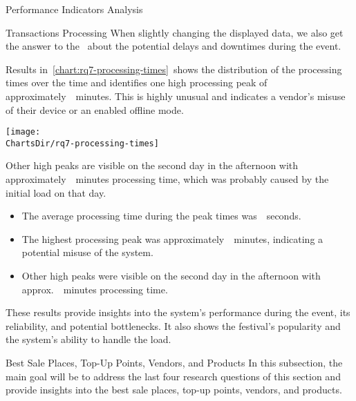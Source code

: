 \begin{section}{Performance Indicators Analysis}
\begin{subsection}{Transactions Processing}
		When slightly changing the displayed data, we also get the answer to the~ about the potential delays and downtimes during the event.


		Results in~\autoref{chart:rq7-processing-times}~shows the distribution of the processing times over the time and identifies one high processing peak of approximately~~minutes.
		This is highly unusual and indicates a vendor's misuse of their device or an enabled offline mode.

		\begin{chart}[h]
			\centering
			\texttt{[image: \\ChartsDir/rq7-processing-times]}
			\caption{ Transaction Processing Times}
			\label{chart:rq7-processing-times}
			\source
		\end{chart}

		Other high peaks are visible on the second day in the afternoon with approximately~~minutes processing time, which was probably caused by the initial load on that day.

		\begin{keytakeaways}
			\begin{itemize}
				\item The average processing time during the peak times was~~seconds.
				\item The highest processing peak was approximately~~minutes, indicating a potential misuse of the system.
				\item Other high peaks were visible on the second day in the afternoon with approx.~~minutes processing time.
			\end{itemize}
		\end{keytakeaways}

		These results provide insights into the system's performance during the event, its reliability, and potential bottlenecks.
		It also shows the festival's popularity and the system's ability to handle the load.

	\end{subsection}

	\begin{subsection}{Best Sale Places, Top-Up Points, Vendors, and Products}
		\label{subsec:analysis-performance-indicators-best}
		In this subsection, the main goal will be to address the last four research questions of this section and provide insights into the best sale places, top-up points, vendors, and products.


\end{subsection}
\end{section}
